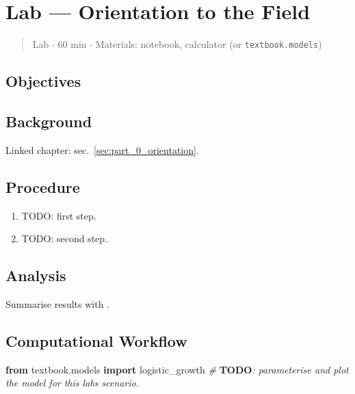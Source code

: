 \documentclass[
]{article}
\newenvironment{Shaded}{}{}
\newcommand{\AlertTok}[1]{\textcolor[rgb]{1.00,0.00,0.00}{\textbf{#1}}}
\newcommand{\CommentTok}[1]{\textcolor[rgb]{0.38,0.63,0.69}{\textit{#1}}}
\newcommand{\ImportTok}[1]{\textcolor[rgb]{0.00,0.50,0.00}{\textbf{#1}}}
\newcommand{\NormalTok}[1]{#1}
\theoremstyle{plain}
\theoremstyle{definition}
\begin{document}
\newpage

\section{Lab --- Orientation to the
Field}\label{sec:lab_part_0_orientation}

\begin{quote}
Lab \texorpdfstring{\ensuremath{\cdot}}{.} 60 min \texorpdfstring{\ensuremath{\cdot}}{.} Materials: notebook, calculator (or
\texttt{textbook.models})
\end{quote}

\subsection{Objectives}\label{objectives}

\subsection{Background}\label{background}

Linked chapter: sec.~\ref{sec:part_0_orientation}.

\subsection{Procedure}\label{procedure}

\begin{enumerate}
\def\labelenumi{\arabic{enumi}.}
\item
  TODO: first step.
\item
  TODO: second step.
\end{enumerate}

\subsection{Analysis}\label{analysis}

Summarise results with .

\subsection{Computational Workflow}\label{computational-workflow}

\begin{Shaded}
\begin{Highlighting}[]
\ImportTok{from}\NormalTok{ textbook.models }\ImportTok{import}\NormalTok{ logistic\_growth}
\CommentTok{\# }\AlertTok{TODO}\CommentTok{: parameterise and plot the model for this lab\textquotesingle{}s scenario.}
\end{Highlighting}
\end{Shaded}
\end{document}
